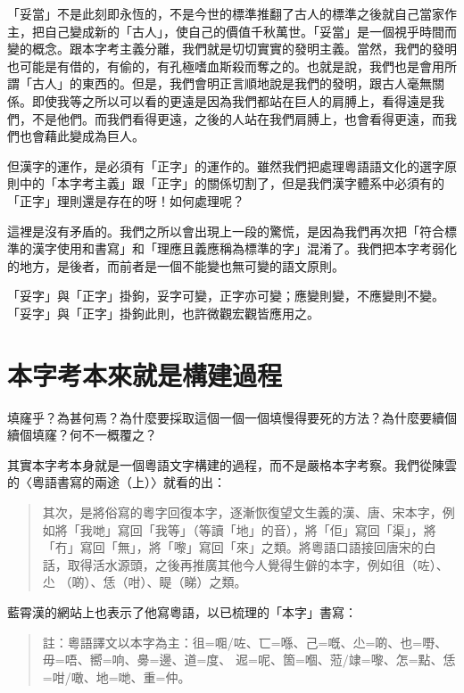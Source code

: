 \documentclass[a5paper, 12pt, openany]{book} %
\begin{document}
「妥當」不是此刻即永恆的，不是今世的標準推翻了古人的標準之後就自己當家作主，把自己變成新的「古人」，使自己的價值千秋萬世。「妥當」是一個視乎時間而變的概念。跟本字考主義分離，我們就是切切實實的發明主義。當然，我們的發明也可能是有借的，有偷的，有孔極嗜血斯殺而奪之的。也就是說，我們也是會用所謂「古人」的東西的。但是，我們會明正言順地說是我們的發明，跟古人毫無關係。即使我等之所以可以看的更遠是因為我們都站在巨人的肩膊上，看得遠是我們，不是他們。而我們看得更遠，之後的人站在我們肩膊上，也會看得更遠，而我們也會藉此變成為巨人。

但漢字的運作，是必須有「正字」的運作的。雖然我們把處理粵語語文化的選字原則中的「本字考主義」跟「正字」的關係切割了，但是我們漢字體系中必須有的「正字」理則還是存在的呀！如何處理呢？

這裡是沒有矛盾的。我們之所以會出現上一段的驚慌，是因為我們再次把「符合標準的漢字使用和書寫」和「理應且義應稱為標準的字」混淆了。我們把本字考弱化的地方，是後者，而前者是一個不能變也無可變的語文原則。

「妥字」與「正字」掛鉤，妥字可變，正字亦可變；應變則變，不應變則不變。「妥字」與「正字」掛鉤此則，也許微觀宏觀皆應用之。

\section{本字考本來就是構建過程}

填窿乎？為甚何焉？為什麼要採取這個一個一個填慢得要死的方法？為什麼要續個續個填窿？何不一概覆之？ 

其實本字考本身就是一個粵語文字構建的過程，而不是嚴格本字考察。我們從陳雲的〈粵語書寫的兩途（上）〉就看的出：

\begin{quotation}
其次，是將俗寫的粵字回復本字，逐漸恢復望文生義的漢、唐、宋本字，例如將「我哋」寫回「我等」（等讀「地」的音），將「佢」寫回「渠」，將「冇」寫回「無」，將「嚟」寫回「來」之類。將粵語口語接回唐宋的白話，取得活水源頭，之後再推廣其他今人覺得生僻的本字，例如徂（咗）、尐 （啲）、恁（咁）、睼（睇）之類。 

\end{quotation}

藍霄漢的網站上也表示了他寫粵語，以已梳理的「本字」書寫：

\begin{quotation}
註：粵語譯文以本字為主：徂=唨/咗、匸=喺、己=嘅、尐=啲、也=嘢、毋=唔、嚮=响、臱=邊、道=度、 迡=呢、箇=嗰、蒞/䇐=嚟、怎=點、恁=咁/噉、地=哋、重=仲。 

\end{quotation}
\end{document}
